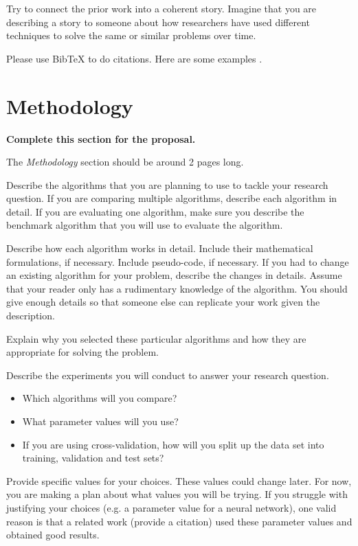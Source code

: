 \documentclass[letterpaper]{article} %
\begin{document}
Try to connect the prior work into a coherent story. Imagine that you are describing a story to someone about how researchers have used different techniques to solve the same or similar problems over time. 

Please use BibTeX to do citations. Here are some examples \cite{SS14,Block62,Novikoff62}.


\section{Methodology}

{\bf Complete this section for the proposal.}

The {\em Methodology} section should be around 2 pages long.

Describe the algorithms that you are planning to use to tackle your research question. If you are comparing multiple algorithms, describe each algorithm in detail. If you are evaluating one algorithm, make sure you describe the benchmark algorithm that you will use to evaluate the algorithm. 

Describe how each algorithm works in detail. Include their mathematical formulations, if necessary. Include pseudo-code, if necessary. If you had to change an existing algorithm for your problem, describe the changes in details. Assume that your reader only has a rudimentary knowledge of the algorithm. You should give enough details so that someone else can replicate your work given the description.

Explain why you selected these particular algorithms and how they are appropriate for solving the problem. 

\medskip
Describe the experiments you will conduct to answer your research question. 
\begin{itemize}
    \item Which algorithms will you compare? 
    \item What parameter values will you use? 
    \item If you are using cross-validation, how will you split up the data set into training, validation and test sets?
\end{itemize} 
Provide specific values for your choices. These values could change later. For now, you are making a plan about what values you will be trying. If you struggle with justifying your choices (e.g. a parameter value for a neural network), one valid reason is that a related work (provide a citation) used these parameter values and obtained good results. 
\end{document}
